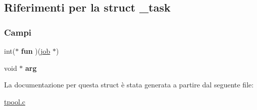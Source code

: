 \hypertarget{struct__task}{}\subsection{Riferimenti per la struct \+\_\+task}
\label{struct__task}
\subsubsection*{Campi}
\begin{DoxyCompactItemize}
\item 
\mbox{\label{struct__task_a9c05922f4aaaba4f47e4575499d8805d}} 
int($\ast$ {\bfseries fun} )(\mbox{\hyperlink{struct__job}{job}} $\ast$)
\item 
\mbox{\label{struct__task_aba6e8e31cc5b4c38ab1cc60cc196a3a4}} 
void $\ast$ {\bfseries arg}
\end{DoxyCompactItemize}


La documentazione per questa struct è stata generata a partire dal seguente file\+:\begin{DoxyCompactItemize}
\item 
\mbox{\hyperlink{tpool_8c}{tpool.\+c}}\end{DoxyCompactItemize}
